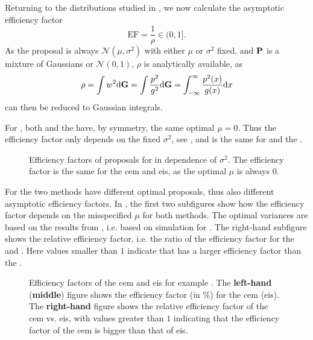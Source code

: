 Returning to the distributions studied in , we now calculate the asymptotic efficiency factor
$$
\text{EF} = \frac{1}{\rho} \in (0, 1].
$$
As the proposal is always $\mathcal N(\mu, \sigma^{2})$ with either $\mu$ or $\sigma^{2}$ fixed, and $\P$ is a mixture of Gaussians or $\mathcal N(0,1)$, $\rho$ is analytically available, as 
$$
    \rho = \int w^{2} \mathrm d \mathcal \G = \int \frac{p^{2}}{g^{2}} \mathrm d \mathcal \G = \int_{-\infty}^\infty \frac{p^{2}(x)}{g(x)} \mathrm d x
$$
can then be reduced to Gaussian integrals.

For , both \aeis and the \acem have, by symmetry, the same optimal $\mu = 0$. Thus the efficiency factor only depends on the fixed $\sigma^{2}$, see , and is the same for \aeis and the \acem.

\begin{figure}
    \centering
    \resizebox{\textwidth}{!}{%
    }
    \caption{Efficiency factors of proposals for  in dependence of $\sigma^{2}$. The efficiency factor is the same for the \acrshort{cem} and \acrshort{eis}, as the optimal $\mu$ is always $0$.}
    \label{fig:rho_mu}

\end{figure}

For  the two methods have different optimal proposals, thus also different asymptotic efficiency factors. In , the first two subfigures show how the efficiency factor depends on the misspecified $\mu$ for both methods. The optimal variances are based on the results from , i.e. based on simulation for \aeis. The right-hand subfigure shows the relative efficiency factor, i.e. the ratio of the efficiency factor for the \acem and \aeis. Here values smaller than $1$ indicate that \aeis has a larger efficiency factor than the \acem. 

\begin{figure}
    \centering

    \resizebox{\textwidth}{!}{%
    }
    \caption{Efficiency factors of the \acrshort{cem} and \acrshort{eis} for example . The \textbf{left-hand} (\textbf{middle}) figure shows the efficiency factor (in \%) for the \acrshort{cem} (\acrshort{eis}). The \textbf{right-hand} figure shows the relative efficiency factor of the \acrshort{cem} vs. \acrshort{eis}, with values greater than $1$ indicating that the efficiency factor of the \acrshort{cem} is bigger than that of \acrshort{eis}.} 
    \label{fig:rho}
\end{figure} 

